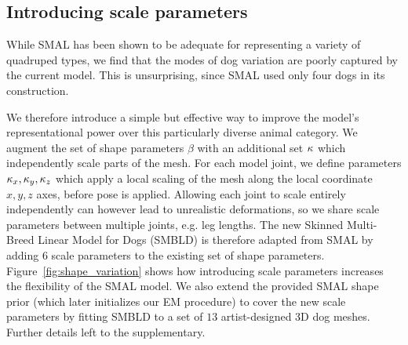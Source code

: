 \subsection{Introducing scale parameters}
While SMAL has been shown to be adequate for representing a variety of quadruped types, we find that the modes of dog variation are poorly captured by the current model. This is unsurprising, since SMAL used only four dogs in its construction.

We therefore introduce a simple but effective way to improve the model's representational power over this particularly diverse  animal category. We augment the set of shape parameters $\beta$ with an additional set $\kappa$ which independently scale parts of the mesh. For each model joint, we define parameters ${\kappa_x,\kappa_y,\kappa_z}$ which apply a local scaling of the mesh along the local coordinate $x, y, z$ axes, before pose is applied. Allowing each joint to scale entirely independently can however lead to unrealistic deformations, so we share scale parameters between multiple joints, e.g. leg lengths. The new Skinned Multi-Breed Linear Model for Dogs (SMBLD) is therefore adapted from SMAL by adding $6$ scale parameters to the existing set of shape parameters. Figure~\ref{fig:shape_variation} shows how introducing scale parameters increases the flexibility of the SMAL model. We also extend the provided SMAL shape prior (which later initializes our EM procedure) to cover the new scale parameters by fitting SMBLD to a set of $13$ artist-designed 3D dog meshes. Further details left to the supplementary.







